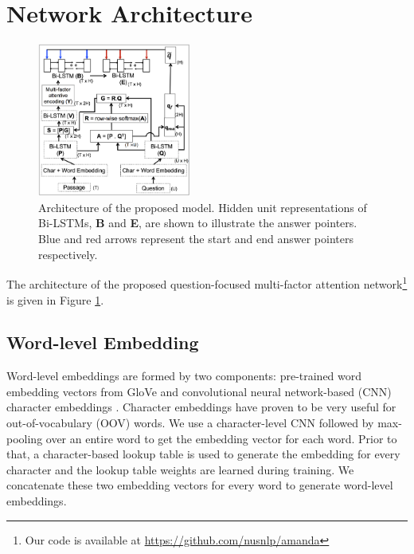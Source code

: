 \documentclass[letterpaper]{article} %
\begin{document}
\section{Network Architecture}
\label{sec:network}
\begin{figure}[t]
\centering
\includegraphics[width=0.45\textwidth]{amandasystem.png}
\caption{Architecture of the proposed model. Hidden unit representations of Bi-LSTMs, \textbf{B} and \textbf{E}, are shown to illustrate the answer pointers. Blue and red arrows represent the start and end answer pointers respectively.}
\label{fig:squad_system_block}
\end{figure}
The architecture of the proposed question-focused multi-factor attention network\footnote{Our code is available at \url{https://github.com/nusnlp/amanda}}
is given in Figure \ref{fig:squad_system_block}.
\subsection{Word-level Embedding}
Word-level embeddings are formed by two components: pre-trained word embedding vectors from GloVe \cite{pennington2014glove} and convolutional neural network-based (CNN) character embeddings \cite{cnn_char_emb_kim2014}.
Character embeddings have proven to be very useful for out-of-vocabulary (OOV) words.
We use a character-level CNN followed by max-pooling over an entire word to get the embedding vector for each word. Prior to that, a character-based lookup table is used to generate the embedding for every character and the lookup table weights are learned during training. We concatenate these two embedding vectors for every word to generate word-level embeddings.
\end{document}
